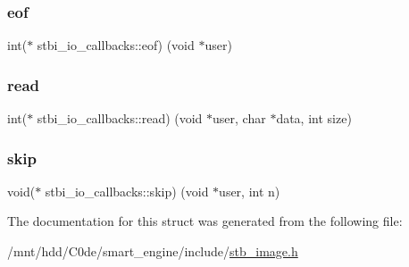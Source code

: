 \subsubsection{\texorpdfstring{eof}{eof}}
{\footnotesize\ttfamily int($\ast$ stbi\+\_\+io\+\_\+callbacks\+::eof) (void $\ast$user)}

\mbox{\label{structstbi__io__callbacks_a623e46b3a2a019611601409926283a88}} 
\subsubsection{\texorpdfstring{read}{read}}
{\footnotesize\ttfamily int($\ast$ stbi\+\_\+io\+\_\+callbacks\+::read) (void $\ast$user, char $\ast$data, int size)}

\mbox{\label{structstbi__io__callbacks_a257aac5480a90a6c4b8fbe86c1b01068}} 
\subsubsection{\texorpdfstring{skip}{skip}}
{\footnotesize\ttfamily void($\ast$ stbi\+\_\+io\+\_\+callbacks\+::skip) (void $\ast$user, int n)}



The documentation for this struct was generated from the following file\+:\begin{DoxyCompactItemize}
\item 
/mnt/hdd/\+C0de/smart\+\_\+engine/include/\hyperlink{stb__image_8h}{stb\+\_\+image.\+h}\end{DoxyCompactItemize}
